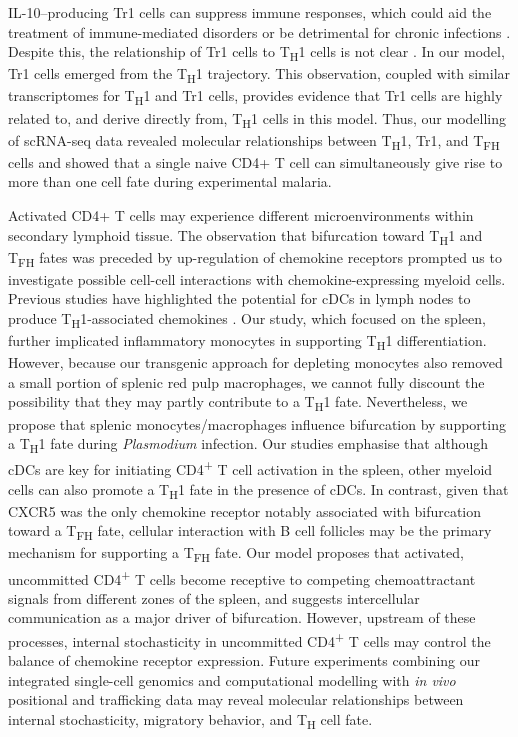 IL-10–producing Tr1 cells can suppress immune responses, which could aid the treatment of immune-mediated disorders \cite{Clemente-Casares2016-pg} or be detrimental for chronic infections \cite{Couper2008-fc}. Despite this, the relationship of Tr1 cells to T\textsubscript{H}1 cells is not clear \cite{Apetoh2010-ri}. In our model, Tr1 cells emerged from the T\textsubscript{H}1 trajectory. This observation, coupled with similar transcriptomes for T\textsubscript{H}1 and Tr1 cells, provides evidence that Tr1 cells are highly related to, and derive directly from, T\textsubscript{H}1 cells in this model. Thus, our modelling of scRNA-seq data revealed molecular relationships between T\textsubscript{H}1, Tr1, and T\textsubscript{FH} cells and showed that a single naive CD4+ T cell can simultaneously give rise to more than one cell fate during experimental malaria.

Activated CD4+ T cells may experience different microenvironments within secondary lymphoid tissue. The observation that bifurcation toward T\textsubscript{H}1 and T\textsubscript{FH} fates was preceded by up-regulation of chemokine receptors prompted us to investigate possible cell-cell interactions with chemokine-expressing myeloid cells. Previous studies have highlighted the potential for cDCs in lymph nodes to produce T\textsubscript{H}1-associated chemokines \cite{Groom2012-az}. Our study, which focused on the spleen, further implicated inflammatory monocytes in supporting T\textsubscript{H}1 differentiation. However, because our transgenic approach for depleting monocytes also removed a small portion of splenic red pulp macrophages, we cannot fully discount the possibility that they may partly contribute to a T\textsubscript{H}1 fate. Nevertheless, we propose that splenic monocytes/macrophages influence bifurcation by supporting a T\textsubscript{H}1 fate during \textit{Plasmodium} infection. Our studies emphasise that although cDCs are key for initiating CD4\textsuperscript{+} T cell activation in the spleen, other myeloid cells can also promote a T\textsubscript{H}1 fate in the presence of cDCs. In contrast, given that CXCR5 was the only chemokine receptor notably associated with bifurcation toward a T\textsubscript{FH} fate, cellular interaction with B cell follicles may be the primary mechanism for supporting a T\textsubscript{FH} fate. Our model proposes that activated, uncommitted CD4\textsuperscript{+} T cells become receptive to competing chemoattractant signals from different zones of the spleen, and suggests intercellular communication as a major driver of bifurcation. However, upstream of these processes, internal stochasticity in uncommitted CD4\textsuperscript{+} T cells may control the balance of chemokine receptor expression. Future experiments combining our integrated single-cell genomics and computational modelling with \textit{in vivo} positional and trafficking data may reveal molecular relationships between internal stochasticity, migratory behavior, and T\textsubscript{H} cell fate.


